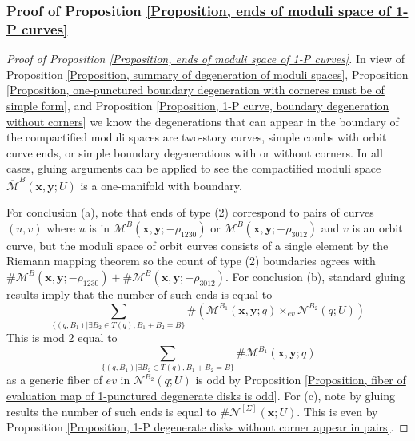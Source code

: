 \documentclass{amsart}
\theoremstyle{definition}
\theoremstyle{remark}
\numberwithin{equation}{section}
\numberwithin{equation}{section} \makeatletter
\begin{document}
\subsubsection{Proof of Proposition \ref{Proposition, ends of moduli space of 1-P curves}}
\begin{proof}[Proof of Proposition \ref{Proposition, ends of moduli space of 1-P curves}]
In view of Proposition \ref{Proposition, summary of degeneration of moduli spaces}, Proposition \ref{Proposition, one-punctured boundary degeneration with corneres must be of simple form}, and Proposition \ref{Proposition, 1-P curve, boundary degeneration without corners} we know the degenerations that can appear in the boundary of the compactified moduli spaces are two-story curves, simple combs with orbit curve ends, or simple boundary degenerations with or without corners. In all cases, gluing arguments can be applied to see the compactified moduli space $\overline{\mathcal{M}}^B(\bm{x},\bm{y};U)$ is a one-manifold with boundary.

For conclusion (a), note that ends of type (2) correspond to pairs of curves $(u,v)$ where $u$ is in $\mathcal{M}^B(\bm{x},\bm{y};-\rho_{1230})$ or $\mathcal{M}^B(\bm{x},\bm{y};-\rho_{3012})$ and $v$ is an orbit curve, but the moduli space of orbit curves consists of a single element by the Riemann mapping theorem so the count of type (2) boundaries agrees with $\#\mathcal{M}^B(\bm{x},\bm{y};-\rho_{1230})+\#\mathcal{M}^B(\bm{x},\bm{y};-\rho_{3012})$. For conclusion (b), standard gluing results imply that the number of such ends is equal to $$\sum_{\{(q,B_1)|\exists B_2\in T(q),B_1+B_2=B\}}\#(\mathcal{M}^{B_1}(\bm{x},\bm{y};q)\times_{ev}\mathcal{N}^{B_2}(q;U))$$ This is mod 2 equal to $$\sum_{\{(q,B_1)|\exists B_2\in T(q),B_1+B_2=B\}}\#\mathcal{M}^{B_1}(\bm{x},\bm{y};q)$$ as a generic fiber of $ev$ in $\mathcal{N}^{B_2}(q;U)$ is odd by Proposition \ref{Proposition, fiber of evaluation map of 1-punctured degenerate disks is odd}. For (c), note by gluing results the number of such ends is equal to $\#\mathcal{N}^{[\Sigma]}(\bm{x};U)$. This is even by Proposition \ref{Proposition, 1-P degenerate disks without corner appear in pairs}.
\end{proof}
\end{document}
